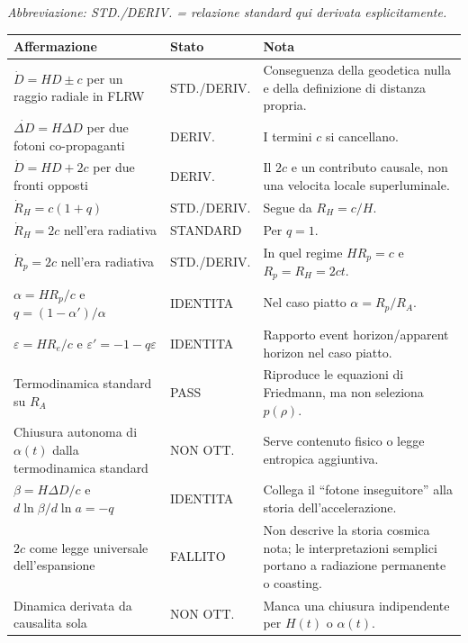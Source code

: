 \documentclass[11pt,a4paper]{article}
\newcommand{\status}[1]{\textsf{#1}}
\begin{document}
\noindent\small\textit{Abbreviazione: STD./DERIV. = relazione standard qui derivata esplicitamente.}\normalsize\par\medskip
\begin{longtable}{p{}p{}p{}}
\toprule
Affermazione & Stato & Nota \\
\midrule
\endhead
$\dot D=HD\pm c$ per un raggio radiale in FLRW & \status{STD./DERIV.} & Conseguenza della geodetica nulla e della definizione di distanza propria. \\
\addlinespace
$\dot{\Delta D}=H\Delta D$ per due fotoni co-propaganti & \status{DERIV.} & I termini $c$ si cancellano. \\
\addlinespace
$\dot D=HD+2c$ per due fronti opposti & \status{DERIV.} & Il $2c$ e un contributo causale, non una velocita locale superluminale. \\
\addlinespace
$\dot R_H=c(1+q)$ & \status{STD./DERIV.} & Segue da $R_H=c/H$. \\
\addlinespace
$\dot R_H=2c$ nell'era radiativa & \status{STANDARD} & Per $q=1$. \\
\addlinespace
$\dot R_p=2c$ nell'era radiativa & \status{STD./DERIV.} & In quel regime $HR_p=c$ e $R_p=R_H=2ct$. \\
\addlinespace
$\alpha=HR_p/c$ e $q=(1-\alpha')/\alpha$ & \status{IDENTITA} & Nel caso piatto $\alpha=R_p/R_A$. \\
\addlinespace
$\varepsilon=HR_e/c$ e $\varepsilon'=-1-q\varepsilon$ & \status{IDENTITA} & Rapporto event horizon/apparent horizon nel caso piatto. \\
\addlinespace
Termodinamica standard su $R_A$ & \status{PASS} & Riproduce le equazioni di Friedmann, ma non seleziona $p(\rho)$. \\
\addlinespace
Chiusura autonoma di $\alpha(t)$ dalla termodinamica standard & \status{NON OTT.} & Serve contenuto fisico o legge entropica aggiuntiva. \\
\addlinespace
$\beta=H\Delta D/c$ e $d\ln\beta/d\ln a=-q$ & \status{IDENTITA} & Collega il ``fotone inseguitore'' alla storia dell'accelerazione. \\
\addlinespace
$2c$ come legge universale dell'espansione & \status{FALLITO} & Non descrive la storia cosmica nota; le interpretazioni semplici portano a radiazione permanente o coasting. \\
\addlinespace
Dinamica derivata da causalita sola & \status{NON OTT.} & Manca una chiusura indipendente per $H(t)$ o $\alpha(t)$. \\

\end{longtable}
\end{document}
